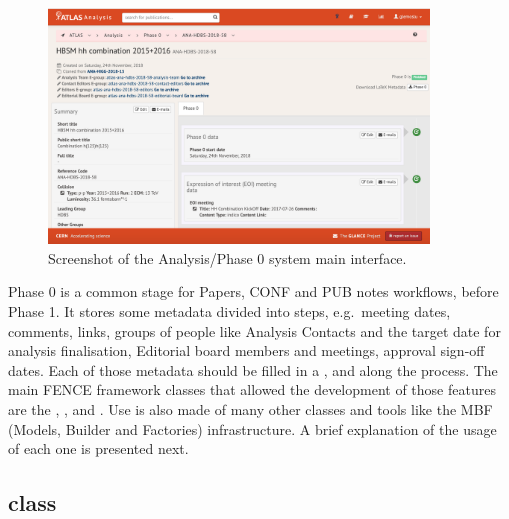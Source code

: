 \begin{figure}[htb]
  \centering
  \includegraphics[width=0.9\textwidth]{figures/Glance_Papers_Phase0.png}
  \caption{Screenshot of the Analysis/Phase 0 system main interface. }%
  \label{fig:Glance_Papers_Phase0}
\end{figure}

Phase 0 is a common stage for Papers, CONF and PUB notes workflows, before Phase 1.
It stores some metadata divided into steps, e.g.\ meeting dates, comments, links, groups of people like Analysis Contacts and the target date for analysis finalisation, Editorial board members and meetings, approval sign-off dates.
Each of those metadata should be filled in a ,  and  along the process.
The main FENCE framework classes that allowed the development of those features are the , ,  and .
Use is also made of many other classes and tools like the MBF (Models, Builder and Factories) infrastructure.
A brief explanation of the usage of each one is presented next.

\subsection{ class}%
\label{sec:Workflow_class}

